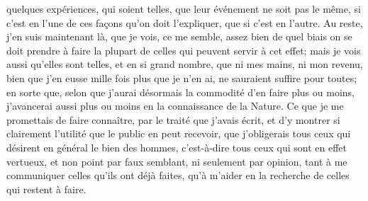\documentclass[french,twoside]{book} %
\begin{document}
quelques expériences, qui soient telles, que leur événement ne soit pas le même, si c'est en l'une de ces façons qu'on doit l'expliquer, que si c'est en l'autre. Au reste, j'en suis maintenant là, que je vois, ce me semble, assez bien de quel biais on se doit prendre à faire la plupart de celles qui peuvent servir à cet effet; mais je vois aussi qu'elles sont telles, et en si grand nombre, que ni mes mains, ni mon revenu, bien que j'en eusse mille fois plus que je n'en ai, ne sauraient suffire pour toutes; en sorte que, selon que j'aurai désormais la commodité d'en faire plus ou moins, j'avancerai aussi plus ou moins en la connaissance de la Nature. Ce que je me promettais de faire connaître, par le traité que j'avais écrit, et d'y montrer si clairement l'utilité que le public en peut recevoir, que j'obligerais tous ceux qui désirent en général le bien des hommes, c'est-à-dire tous ceux qui sont en effet vertueux, et non point par faux semblant, ni seulement par opinion, tant à me communiquer celles qu'ils ont déjà faites, qu'à m'aider en la recherche de celles qui restent à faire.\par
\end{document}
